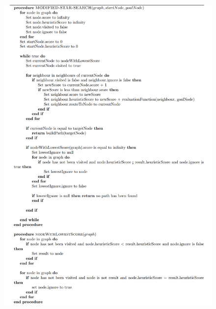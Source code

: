\documentclass{article}
\begin{document}
\begin{figure}[bp!]
\includegraphics[width=15cm]{QuestionGPuesdocode.png}
\centering
\end{figure}
\end{document}
